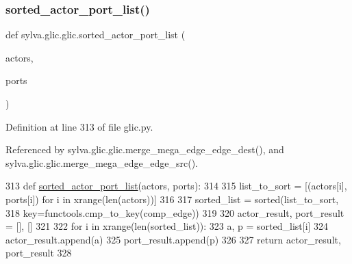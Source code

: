\mbox{\label{namespacesylva_1_1glic_1_1glic_af9c053311339f7220d8a605b492126c0}} 
\subsubsection{\texorpdfstring{sorted\+\_\+actor\+\_\+port\+\_\+list()}{sorted\_actor\_port\_list()}}
{\footnotesize\ttfamily def sylva.\+glic.\+glic.\+sorted\+\_\+actor\+\_\+port\+\_\+list (\begin{DoxyParamCaption}\item[{}]{actors,  }\item[{}]{ports }\end{DoxyParamCaption})}



Definition at line 313 of file glic.\+py.



Referenced by sylva.\+glic.\+glic.\+merge\+\_\+mega\+\_\+edge\+\_\+edge\+\_\+dest(), and sylva.\+glic.\+glic.\+merge\+\_\+mega\+\_\+edge\+\_\+edge\+\_\+src().


\begin{DoxyCode}
313     \textcolor{keyword}{def }\hyperlink{namespacesylva_1_1glic_1_1glic_af9c053311339f7220d8a605b492126c0}{sorted\_actor\_port\_list}(actors, ports):
314 
315         list\_to\_sort = [(actors[i], ports[i]) \textcolor{keywordflow}{for} i \textcolor{keywordflow}{in} xrange(len(actors))]
316 
317         sorted\_list = sorted(list\_to\_sort,
318                              key=functools.cmp\_to\_key(comp\_edge))
319 
320         actor\_result, port\_result = [], []
321 
322         \textcolor{keywordflow}{for} i \textcolor{keywordflow}{in} xrange(len(sorted\_list)):
323             a, p = sorted\_list[i]
324             actor\_result.append(a)
325             port\_result.append(p)
326 
327         \textcolor{keywordflow}{return} actor\_result, port\_result
328 
\end{DoxyCode}
\mbox{\label{namespacesylva_1_1glic_1_1glic_aa33f0fa18db2dc181313352cfdbc0cca}} 

